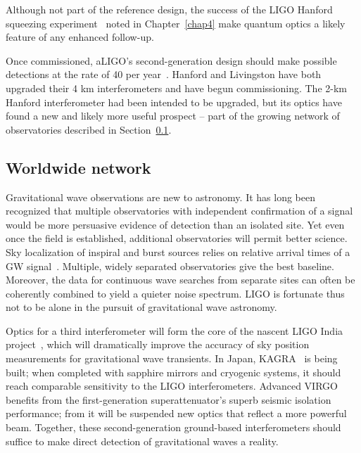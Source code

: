 Although not part of the reference design, the success of the LIGO Hanford squeezing experiment~\cite{BarsottiNatureSqueezing,ChuaBackscatteredLight,DwyerPhaseNoise} noted in Chapter~\ref{chap4} make quantum optics a likely feature of any enhanced follow-up.

Once commissioned, aLIGO's second-generation design should make possible detections at the rate of 40 per year~\cite{AbadieRates2010}. 
Hanford and Livingston have both upgraded their 4 km interferometers and have begun commissioning.
The 2-km Hanford interferometer had been intended to be upgraded, but its optics have found a new and likely more useful prospect -- part of the growing network of observatories described in Section~\ref{worldwide}.

        \subsection{Worldwide network}
        \label{worldwide}
 
Gravitational wave observations are new to astronomy.
It has long been recognized that multiple observatories with independent confirmation of a signal would be more persuasive evidence of detection than an isolated site.
Yet even once the field is established, additional observatories will permit better science.
Sky localization of inspiral and burst sources relies on relative arrival times of a GW signal~\cite{Saulson}.
Multiple, widely separated observatories give the best baseline.
Moreover, the data for continuous wave searches from separate sites can often be coherently combined to yield a quieter noise spectrum.
LIGO is fortunate thus not to be alone in the pursuit of gravitational wave astronomy.

Optics for a third interferometer will form the core of the nascent LIGO India project~\cite{IyerIndia2011}, which will dramatically improve the accuracy of sky position measurements for gravitational wave transients.
In Japan, KAGRA~\cite{Kuroda2010} is being built; when completed with sapphire mirrors and cryogenic systems, it should reach comparable sensitivity to the LIGO interferometers.
Advanced VIRGO~\cite{Acernese2009} benefits from the first-generation superattenuator's superb seismic isolation performance; from it will be suspended new optics that reflect a more powerful beam.
Together, these second-generation ground-based interferometers should suffice to make direct detection of gravitational waves a reality.

